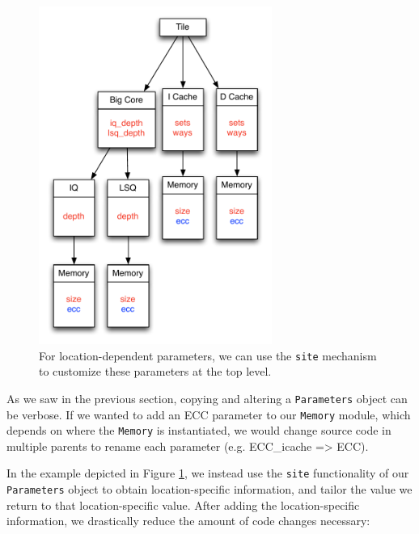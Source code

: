 \documentclass[10pt,twocolumn]{article}
\def\code#1{{\small\tt #1}}
\begin{document}
\begin{figure}[h]
\centering
\includegraphics[width=3in]{figs/ex4}
\caption{For location-dependent parameters, we can use the \code{site} mechanism to customize these parameters at the top level.}
\label{fig:ex4}
\end{figure}

As we saw in the previous section, copying and altering a \code{Parameters} object can be verbose. If we wanted to add an ECC parameter to our \code{Memory} module, which depends on where the \code{Memory} is instantiated, we would change source code in multiple parents to rename each parameter (e.g. ECC\_icache => ECC).

In the example depicted in Figure \ref{fig:ex4}, we instead use the \code{site} functionality of our \code{Parameters} object to obtain location-specific information, and tailor the value we return to that location-specific value. After adding the location-specific information, we drastically reduce the amount of code changes necessary:
\end{document}

